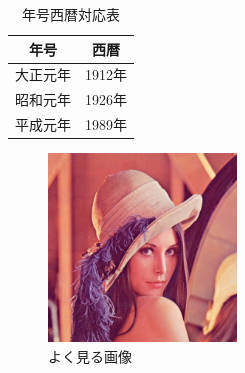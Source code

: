 \begin{table}[hbtp]
  \caption{年号西暦対応表}
  \label{table:era_and_ad}
  \begin{tabular}{cc}
    \hline
    年号 & 西暦 \\
    \hline \hline
    大正元年 & 1912年 \\
    昭和元年 & 1926年 \\
    平成元年 & 1989年 \\
    \hline
  \end{tabular}
\end{table}

\begin{figure}
  \includegraphics[width=50mm]{lenna.png}
  \caption{よく見る画像}
  \label{image:lenna}
\end{figure}




